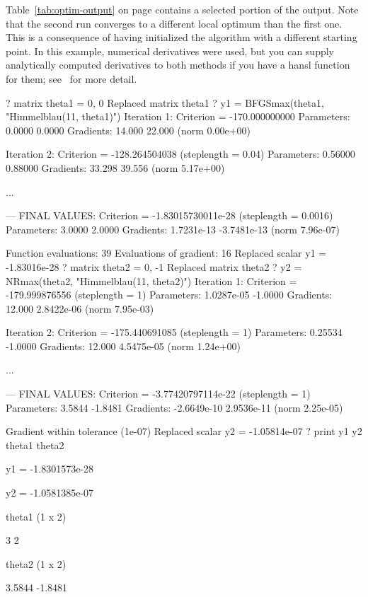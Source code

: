 Table~\ref{tab:optim-output} on page \pageref{tab:optim-output}
contains a selected portion of the output. Note that the second run
converges to a different local optimum than the first one. This is a
consequence of having initialized the algorithm with a different
starting point. In this example, numerical derivatives were used, but
you can supply analytically computed derivatives to both methods if
you have a hansl function for them; see \GUG\ for more detail.

\begin{table}[ht]
  \begin{footnotesize}
\begin{scode}
? matrix theta1 = { 0, 0 }
Replaced matrix theta1
? y1 = BFGSmax(theta1, "Himmelblau(11, theta1)")
Iteration 1: Criterion = -170.000000000
Parameters:       0.0000      0.0000
Gradients:        14.000      22.000 (norm 0.00e+00)

Iteration 2: Criterion = -128.264504038 (steplength = 0.04)
Parameters:      0.56000     0.88000
Gradients:        33.298      39.556 (norm 5.17e+00)

...

--- FINAL VALUES: 
Criterion = -1.83015730011e-28 (steplength = 0.0016)
Parameters:       3.0000      2.0000
Gradients:    1.7231e-13 -3.7481e-13 (norm 7.96e-07)

Function evaluations: 39
Evaluations of gradient: 16
Replaced scalar y1 = -1.83016e-28
? matrix theta2 = { 0, -1 }
Replaced matrix theta2
? y2 = NRmax(theta2, "Himmelblau(11, theta2)")
Iteration 1: Criterion = -179.999876556 (steplength = 1)
Parameters:   1.0287e-05     -1.0000
Gradients:        12.000  2.8422e-06 (norm 7.95e-03)

Iteration 2: Criterion = -175.440691085 (steplength = 1)
Parameters:      0.25534     -1.0000
Gradients:        12.000  4.5475e-05 (norm 1.24e+00)

...

--- FINAL VALUES: 
Criterion = -3.77420797114e-22 (steplength = 1)
Parameters:       3.5844     -1.8481
Gradients:   -2.6649e-10  2.9536e-11 (norm 2.25e-05)

Gradient within tolerance (1e-07)
Replaced scalar y2 = -1.05814e-07
? print y1 y2 theta1 theta2

             y1 = -1.8301573e-28

             y2 = -1.0581385e-07

theta1 (1 x 2)

  3   2 

theta2 (1 x 2)

      3.5844      -1.8481 
\end{scode}
    
  \end{footnotesize}
  \caption{Output from maximization}
  \label{tab:optim-output}
\end{table}

